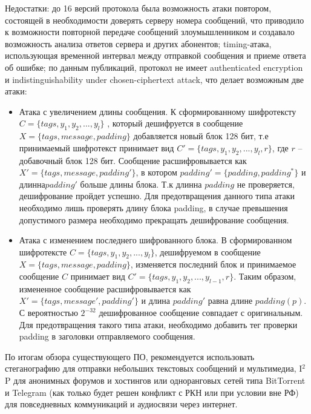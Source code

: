Недостатки: до 16 версий протокола была  возможность атаки повтором, состоящей в необходимости доверять серверу номера сообщений, что приводило к возможности повторной передаче сообщений злоумышленником и создавало возможность анализа ответов сервера и других абонентов; timing-атака, использующая  временной интервал между отправкой сообщения и приеме ответа об ошибке; по данным публикаций, протокол не имеет authenticated encryption и indistinguishability under chosen-ciphertext attack, что делает возможным две атаки:
\begin{itemize}
	\item Атака с увеличением длины сообщения. К сформированному шифротексту $ C=\{tags, y_{1}, y_{2}, ... , y_{l}\} $ , который дешифруется в сообщение $ X= \{tags,message,padding\} $ добавляется новый блок 128 бит, т.е принимаемый шифротекст принимает вид $ C'=\{tags, y_{1}, y_{2}, ... , y_{l}, r\} $, где $ r $ -- добавочный блок 128 бит. Сообщение расшифровывается как $ X'= \{tags,message,padding'\} $, в котором $  padding' =  \{padding, padding^{*}\}$ и длинна$  padding' $ больше длины блока. Т.к длинна $ padding $ не проверяется, дешифрование пройдет успешно. Для предотвращения данного типа атаки необходимо лишь проверять длину блока padding, в случае превышения допустимого размера необходимо прекращать дешифрование сообщения.
	\item Атака с изменением последнего шифрованного блока. В сформированном шифротексте $ C=\{tags, y_{1}, y_{2}, ... , y_{l}\} $, дешифруемом в сообщение $ X=  \{tags,message,padding\} $, изменяется последний блок и принимаемое сообщение  $ C $ принимает вид $ C'=\{tags, y_{1}, y_{2}, ... , y_{l-1}, r\} $. Таким образом, измененное сообщение расшифровывается как    $ X'= \{tags,message',padding'\} $ и длина $ padding' $ равна длине $ padding(p) $. С вероятностью $ 2^{-32} $ дешифрованное сообщение совпадает с оригинальным. Для предотвращения  такого типа атаки, необходимо добавить тег проверки padding в заголовки отправляемого сообщения. \cite{TG2} %
	
\end{itemize}


По итогам обзора существующего ПО, рекомендуется использовать стеганографию для отправки небольших текстовых сообщений и мультимедиа, I$ ^{2} $P для анонимных форумов и хостингов  или одноранговых сетей типа BitTorrent и Telegram (как только будет решен конфликт с РКН или при условии вне РФ) для повседневных коммуникаций и аудиосвязи через интернет.

